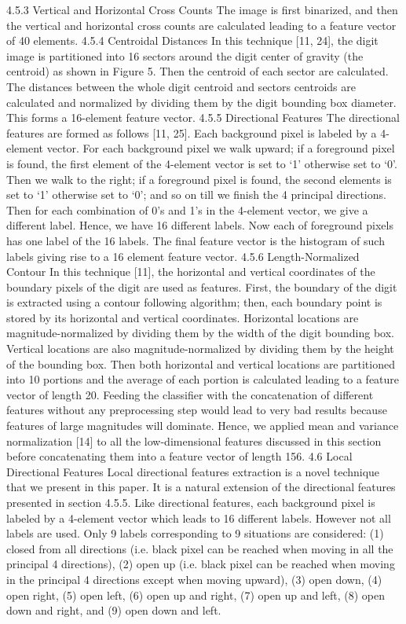 \documentclass[conference]{IEEEtran}
\begin{document}
4.5.3 Vertical and Horizontal Cross Counts
The image is first binarized, and then the vertical and horizontal cross counts are calculated leading to a feature vector of 40 elements.
4.5.4 Centroidal Distances
In this technique [11, 24], the digit image is partitioned into 16 sectors around the digit center of gravity (the centroid) as shown in Figure 5. Then the centroid of each sector are calculated. The distances between the whole digit centroid and sectors centroids are calculated and normalized by dividing them by the digit bounding box diameter. This forms a 16-element feature vector.
4.5.5 Directional Features
The directional features are formed as follows [11, 25]. Each background pixel is labeled by a 4-element vector. For each background pixel we walk upward; if a foreground pixel is found, the first element of the 4-element vector is set to ‘1’ otherwise set to ‘0’. Then we walk to the right; if a foreground pixel is found, the second elements is set to ‘1’ otherwise set to ‘0’; and so on till we finish the 4 principal directions. Then for each combination of 0’s and 1’s in the 4-element vector, we give a different label. Hence, we have 16 different labels. Now each of foreground pixels has one label of the 16 labels. The final feature vector is the histogram of such labels giving rise to a 16 element feature vector.
4.5.6 Length-Normalized Contour
In this technique [11], the horizontal and vertical coordinates of the boundary pixels of the digit are used as features. First, the boundary of the digit is extracted using a contour following algorithm; then, each boundary point is stored by its horizontal and vertical coordinates. Horizontal locations are magnitude-normalized by dividing them by the width of the digit bounding box. Vertical locations are also magnitude-normalized by dividing them by the height of the bounding box. Then both horizontal and vertical locations are partitioned into 10 portions and the average of each portion is calculated leading to a feature vector of length 20.
Feeding the classifier with the concatenation of different features without any preprocessing step would lead to very bad results because features of large magnitudes will dominate. Hence, we applied mean and variance normalization [14] to all the low-dimensional features discussed in this section before concatenating them into a feature vector of length 156.
4.6 Local Directional Features
Local directional features extraction is a novel technique that we present in this paper. It is a natural extension of the directional features presented in section 4.5.5. Like directional features, each background pixel is labeled by a 4-element vector which leads to 16 different labels. However not all labels are used. Only 9 labels corresponding to 9 situations are considered: (1) closed from all directions (i.e. black pixel can be reached when moving in all the principal 4 directions), (2) open up (i.e. black pixel can be reached when moving in the principal 4 directions except when moving upward), (3) open down, (4) open right, (5) open left, (6) open up and right, (7) open up and left, (8) open down and right, and (9) open down and left.
\end{document}
